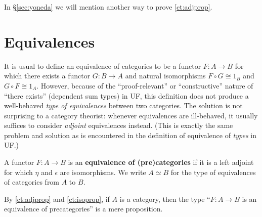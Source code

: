\documentclass{mscs}
\numberwithin{equation}{section}
\begin{document}
In \S\ref{sec:yoneda} we will mention another way to prove \autoref{ct:adjprop}.


\section{Equivalences}
\label{sec:equivalences}

It is usual to define an equivalence of categories to be a functor $F:A\to B$ for which there exists a functor $G:B\to A$ and natural isomorphisms $F\circ G \cong 1_B$ and $G\circ F \cong 1_A$.
However, because of the ``proof-relevant'' or ``constructive'' nature of ``there exists'' (dependent sum types) in UF, this definition does not produce a well-behaved \emph{type of equivalences} between two categories.
The solution is not surprising to a category theorist: whenever equivalences are ill-behaved, it usually suffices to consider \emph{adjoint} equivalences instead.
(This is exactly the same problem and solution as is encountered in the definition of equivalence of \emph{types} in UF.)

\begin{defn}
  A functor $F:A\to B$ is an \textbf{equivalence of (pre)categories} if it is a left adjoint for which $\eta$ and $\epsilon$ are isomorphisms.
  We write $A\simeq B$ for the type of equivalences of categories from $A$ to $B$.
\end{defn}

By \autoref{ct:adjprop} and \autoref{ct:isoprop}, if $A$ is a category, then the type ``$F:A\to B$ is an equivalence of precategories'' is a mere proposition.
\end{document}
